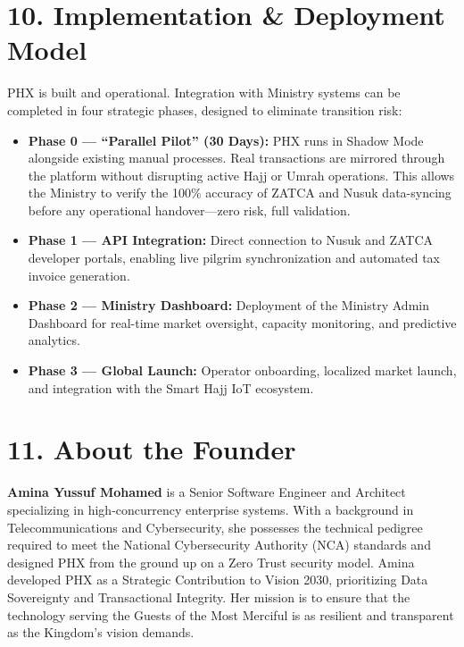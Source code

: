 \documentclass[11pt,a4paper]{article}
\begin{document}
\section*{10. Implementation \& Deployment Model}

PHX is built and operational. Integration with Ministry systems can be completed in four strategic phases, designed to eliminate transition risk:

\begin{itemize}
  \item \textbf{Phase 0 --- ``Parallel Pilot'' (30 Days):} PHX runs in Shadow Mode alongside existing manual processes. Real transactions are mirrored through the platform without disrupting active Hajj or Umrah operations. This allows the Ministry to verify the 100\% accuracy of ZATCA and Nusuk data-syncing before any operational handover---zero risk, full validation.
  \item \textbf{Phase 1 --- API Integration:} Direct connection to Nusuk and ZATCA developer portals, enabling live pilgrim synchronization and automated tax invoice generation.
  \item \textbf{Phase 2 --- Ministry Dashboard:} Deployment of the Ministry Admin Dashboard for real-time market oversight, capacity monitoring, and predictive analytics.
  \item \textbf{Phase 3 --- Global Launch:} Operator onboarding, localized market launch, and integration with the Smart Hajj IoT ecosystem.
\end{itemize}

\vspace{0pt plus 1fil}
\pagebreak[3]

\section*{11. About the Founder}


\textbf{Amina Yussuf Mohamed} is a Senior Software Engineer and Architect specializing in high-concurrency enterprise systems. With a background in Telecommunications and Cybersecurity, she possesses the technical pedigree required to meet the National Cybersecurity Authority (NCA) standards and designed PHX from the ground up on a Zero Trust security model. Amina developed PHX as a Strategic Contribution to Vision 2030, prioritizing Data Sovereignty and Transactional Integrity. Her mission is to ensure that the technology serving the Guests of the Most Merciful is as resilient and transparent as the Kingdom's vision demands.
\end{document}
